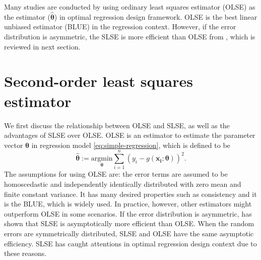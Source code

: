 \documentclass[
]{book}
\theoremstyle{definition}
\theoremstyle{definition}
\theoremstyle{definition}
\theoremstyle{definition}
\theoremstyle{remark}
\begin{document}
Many studies are conducted by using ordinary least squares estimator (OLSE) as the estimator (\(\hat{\boldsymbol{\theta}}\)) in optimal regression design framework. OLSE is the best linear unbiased estimator (BLUE) in the regression context. However, if the error distribution is asymmetric, the SLSE is more efficient than OLSE from \citet{wang2008second}, which is reviewed in next section.

\hypertarget{section-SLSE}{%
\section{Second-order least squares estimator}\label{section-SLSE}}

We first discuss the relationship between OLSE and SLSE, as well as the advantages of SLSE over OLSE. OLSE is an estimator to estimate the parameter vector \(\boldsymbol{\theta}\) in regression model \eqref{eq:simple-regression}, which is defined to be
\begin{equation*}
\boldsymbol{\hat{\theta}}:=\underset{\boldsymbol{\theta}}{\mathrm{argmin}}\sum_{i=1}^n 
(y_i-g(\boldsymbol{x_i};\boldsymbol{\theta}) )^2. 
\end{equation*}
The assumptions for using OLSE are: the error terms are assumed to be homoscedastic and independently identically distributed with zero mean and finite constant variance. It has many desired properties such as consistency and it is the BLUE, which is widely used. In practice, however, other estimators might outperform OLSE in some scenarios. If the error distribution is asymmetric, \citet{wang2008second} has shown that SLSE is asymptotically more efficient than OLSE. When the random errors are symmetrically distributed, SLSE and OLSE have the same asymptotic efficiency. SLSE has caught attentions in optimal regression design context due to these reasons.
\end{document}
